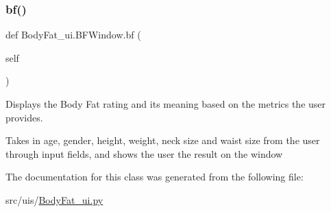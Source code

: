 \subsubsection{\texorpdfstring{bf()}{bf()}}
{\footnotesize\ttfamily def Body\+Fat\+\_\+ui.\+B\+F\+Window.\+bf (\begin{DoxyParamCaption}\item[{}]{self }\end{DoxyParamCaption})}



Displays the Body Fat rating and its meaning based on the metrics the user provides. 

Takes in age, gender, height, weight, neck size and waist size from the user through input fields, and shows the user the result on the window 

The documentation for this class was generated from the following file\+:\begin{DoxyCompactItemize}
\item 
src/uis/\hyperlink{_body_fat__ui_8py}{Body\+Fat\+\_\+ui.\+py}\end{DoxyCompactItemize}
